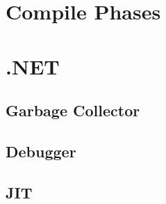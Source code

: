 \makeatletter {}\makeatother
{}
\section{Compile Phases}

\section{.NET}
\subsection{Garbage Collector}
\subsection{Debugger}
\subsection{JIT}
\worksheetend